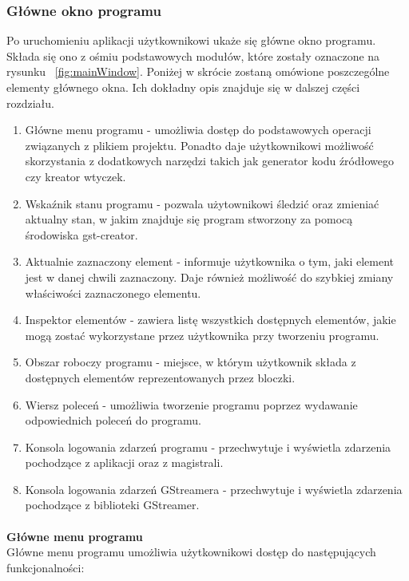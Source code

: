 \documentclass[12pt]{article}
\begin{document}
\subsubsection{Główne okno programu}
Po uruchomieniu aplikacji użytkownikowi ukaże się główne okno programu. Składa się ono z ośmiu podstawowych modułów, które zostały oznaczone na rysunku ~\ref{fig:mainWindow}. Poniżej w skrócie zostaną omówione poszczególne elementy głównego okna. Ich dokładny opis znajduje się w dalszej części rozdziału.
\begin{enumerate}
  \setlength{\itemsep}{0em}
\item Główne menu programu - umożliwia dostęp do podstawowych operacji związanych z plikiem projektu. Ponadto daje użytkownikowi możliwość skorzystania z dodatkowych narzędzi takich jak generator kodu źródłowego czy kreator wtyczek.
\item Wskaźnik stanu programu - pozwala użytownikowi śledzić oraz zmieniać aktualny stan, w jakim znajduje się program stworzony za pomocą środowiska gst-creator.
\item Aktualnie zaznaczony element - informuje użytkownika o tym, jaki element jest w danej chwili zaznaczony. Daje również możliwość do szybkiej zmiany właściwości zaznaczonego elementu.
\item Inspektor elementów - zawiera listę wszystkich dostępnych elementów, jakie mogą zostać wykorzystane przez użytkownika przy tworzeniu programu.
\item Obszar roboczy programu - miejsce, w którym użytkownik składa z dostępnych elementów reprezentowanych przez bloczki.
\item Wiersz poleceń - umożliwia tworzenie programu poprzez wydawanie odpowiednich poleceń do programu.
\item Konsola logowania zdarzeń programu - przechwytuje i wyświetla zdarzenia pochodzące z aplikacji oraz z magistrali.
\item Konsola logowania zdarzeń GStreamera - przechwytuje i wyświetla zdarzenia pochodzące z biblioteki GStreamer.
\end{enumerate}\paragraph{}\vspace{-3mm}
\textbf{Główne menu programu} \\
Główne menu programu umożliwia użytkownikowi dostęp do następujących funkcjonalności:
\end{document}
